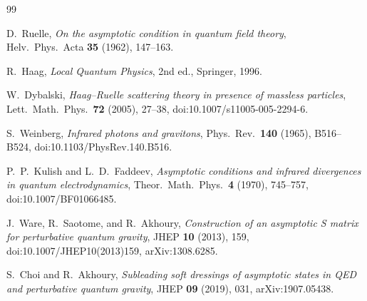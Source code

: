 \documentclass[11pt]{article}
\begin{document}
\begin{thebibliography}{99}

D.~Ruelle,
\emph{On the asymptotic condition in quantum field theory},
Helv.\ Phys.\ Acta \textbf{35} (1962), 147--163.

R.~Haag,
\emph{Local Quantum Physics},
2nd ed., Springer, 1996.

W.~Dybalski,
\emph{Haag--Ruelle scattering theory in presence of massless particles},
Lett.\ Math.\ Phys.\ \textbf{72} (2005), 27--38,
doi:10.1007/s11005-005-2294-6.

S.~Weinberg,
\emph{Infrared photons and gravitons},
Phys.\ Rev.\ \textbf{140} (1965), B516--B524,
doi:10.1103/PhysRev.140.B516.

P.~P.~Kulish and L.~D.~Faddeev,
\emph{Asymptotic conditions and infrared divergences in quantum
electrodynamics},
Theor.\ Math.\ Phys.\ \textbf{4} (1970), 745--757,
doi:10.1007/BF01066485.

J.~Ware, R.~Saotome, and R.~Akhoury,
\emph{Construction of an asymptotic S matrix for perturbative quantum
gravity},
JHEP \textbf{10} (2013), 159,
doi:10.1007/JHEP10(2013)159,
arXiv:1308.6285.

S.~Choi and R.~Akhoury,
\emph{Subleading soft dressings of asymptotic states in QED and
perturbative quantum gravity},
JHEP \textbf{09} (2019), 031,
arXiv:1907.05438.

\end{thebibliography}
\end{document}
